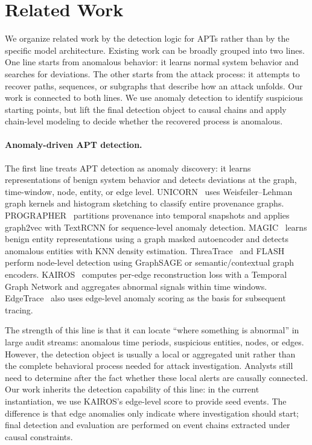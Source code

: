 \section{Related Work}
\label{sec:related}

We organize related work by the detection logic for APTs rather than by the specific model architecture. Existing work can be broadly grouped into two lines. One line starts from anomalous behavior: it learns normal system behavior and searches for deviations. The other starts from the attack process: it attempts to recover paths, sequences, or subgraphs that describe how an attack unfolds. Our work is connected to both lines. We use anomaly detection to identify suspicious starting points, but lift the final detection object to causal chains and apply chain-level modeling to decide whether the recovered process is anomalous.

\paragraph{Anomaly-driven APT detection.}

The first line treats APT detection as anomaly discovery: it learns representations of benign system behavior and detects deviations at the graph, time-window, node, entity, or edge level. UNICORN~\cite{unicorn2020} uses Weisfeiler--Lehman graph kernels and histogram sketching to classify entire provenance graphs. PROGRAPHER~\cite{yang2023prographer} partitions provenance into temporal snapshots and applies graph2vec with TextRCNN for sequence-level anomaly detection. MAGIC~\cite{jia2024magic} learns benign entity representations using a graph masked autoencoder and detects anomalous entities with KNN density estimation. ThreaTrace~\cite{wang2022threatrace} and FLASH~\cite{flash2024} perform node-level detection using GraphSAGE or semantic/contextual graph encoders. KAIROS~\cite{cheng2024kairos} computes per-edge reconstruction loss with a Temporal Graph Network and aggregates abnormal signals within time windows. EdgeTrace~\cite{edgetrace2025} also uses edge-level anomaly scoring as the basis for subsequent tracing.

The strength of this line is that it can locate ``where something is abnormal'' in large audit streams: anomalous time periods, suspicious entities, nodes, or edges. However, the detection object is usually a local or aggregated unit rather than the complete behavioral process needed for attack investigation. Analysts still need to determine after the fact whether these local alerts are causally connected. Our work inherits the detection capability of this line: in the current instantiation, we use KAIROS's edge-level score to provide seed events. The difference is that edge anomalies only indicate where investigation should start; final detection and evaluation are performed on event chains extracted under causal constraints.

